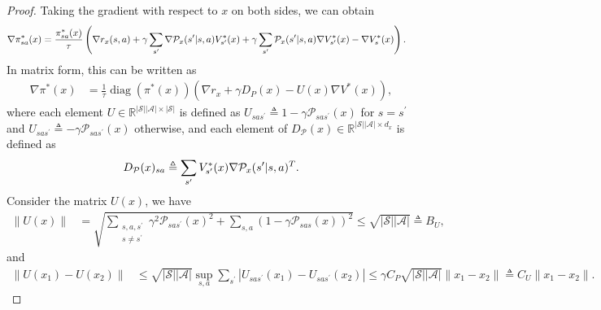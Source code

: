 \documentclass{article}
\theoremstyle{plain}
\theoremstyle{definition}
\theoremstyle{remark}
\def\R{\mathbb R}
\def\cA{\mathcal A}
\def\cP{\mathcal P}
\def\cS{\mathcal S}
\def\bydef{\triangleq}
\DeclareMathOperator{\diag}{diag}
\begin{document}
\begin{proof}
Taking the gradient with respect to $x$ on both sides, we can obtain
    \begin{align}
        \nabla \pi^*_{sa}(x) & = \frac{\pi^*_{sa}(x)}{\tau}  \left( \nabla r_x(s,a) + \gamma \sum_{s^\prime} \nabla \cP_x(s^\prime|s,a) V^*_{s^\prime}(x) + \gamma \sum_{s^\prime} \cP_x(s^\prime|s,a) \nabla V^*_{s^\prime}(x) - \nabla V^*_s(x)  \right). \notag
    \end{align}
    In matrix form, this can be written as
    \begin{align}
        \nabla \pi^*(x) & = \frac{1}{\tau} \diag(\pi^*(x)) \left( \nabla r_x + \gamma D_{P}(x) - U(x) \nabla V^*(x)  \right),
    \end{align}
    where each element $U \in \R^{|\cS||\cA| \times |\cS|}$ is defined as $U_{sas^\prime} \bydef 1 - \gamma \cP_{sas^\prime}(x)$ for $s = s^\prime$ and $U_{sas^\prime} \bydef - \gamma \cP_{sas^\prime}(x)$ otherwise, and each element of $D_\cP(x) \in \R^{|\cS||\cA| \times d_x}$ is defined as
    \begin{align}
        D_\cP(x)_{sa} \bydef \sum_{s^\prime} V^*_{s^\prime}(x) \nabla \cP_x(s^\prime|s,a)^T. \notag
    \end{align}
    Consider the matrix $U(x)$, we have
    \begin{align}
        \| U(x) \| & =  \sqrt{ \sum_{ \substack{s,a,s^\prime \\s \neq s^\prime}} \gamma^2 \cP_{sas^\prime}(x)^2 + \sum_{s,a} (1 - \gamma \cP_{sas}(x))^2} \leq \sqrt{|\cS||\cA|} \bydef B_U, 
    \end{align}
    and 
    \begin{align}
        \| U(x_1) - U(x_2) \| & \leq \sqrt{|\cS||\cA|} \sup_{s,a} \sum_{s^\prime} |U_{sas^\prime}(x_1) - U_{sas^\prime}(x_2)| \leq \gamma C_P \sqrt{|\cS||\cA|} \|x_1 - x_2\| \bydef C_U \|x_1 - x_2\|. 
    \end{align}


\end{proof}
\end{document}
